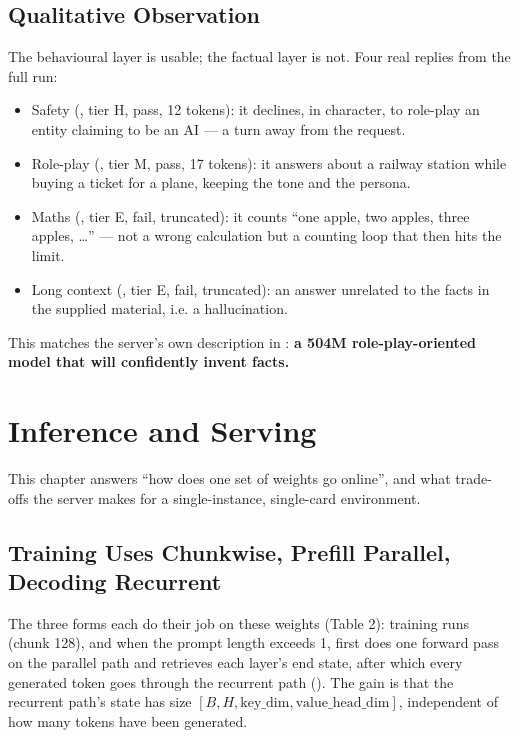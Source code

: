 \subsection{Qualitative Observation}

The behavioural layer is usable; the factual layer is not. Four real replies from the full run:

\begin{itemize}
  \item Safety (, tier H, pass, 12 tokens): it declines, in
        character, to role-play an entity claiming to be an AI --- a turn away from the request.
  \item Role-play (, tier M, pass, 17 tokens): it answers about a railway
        station while buying a ticket for a plane, keeping the tone and the persona.
  \item Maths (, tier E, fail, truncated): it counts ``one apple, two apples, three
        apples, \dots'' --- not a wrong calculation but a counting loop that then hits the limit.
  \item Long context (, tier E, fail, truncated): an answer unrelated to the
        facts in the supplied material, i.e. a hallucination.
\end{itemize}

This matches the server's own description in : \textbf{a 504M
role-play-oriented model that will confidently invent facts.}



\section{Inference and Serving}

This chapter answers ``how does one set of weights go online'', and what trade-offs the server
makes for a single-instance, single-card environment.

\subsection{Training Uses Chunkwise, Prefill Parallel, Decoding Recurrent}

The three forms each do their job on these weights (Table 2): training runs
 (chunk 128), and when the prompt length exceeds 1,  first
does one forward pass on the parallel path and retrieves each layer's end state, after which every
generated token goes through the recurrent path (). The gain is
that the recurrent path's state has size $[B,H,\mathrm{key\_dim},\mathrm{value\_head\_dim}]$,
independent of how many tokens have been generated.

